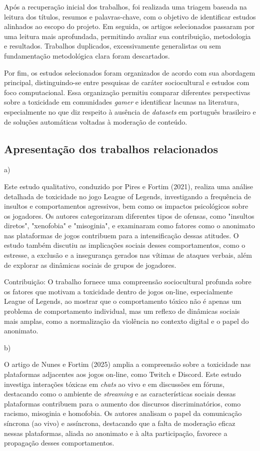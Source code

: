\documentclass{eic-bcc-tcc}
\begin{document}
Após a recuperação inicial dos trabalhos, foi realizada uma triagem baseada na leitura dos títulos, resumos e palavras-chave, com o objetivo de identificar estudos alinhados ao escopo do projeto. Em seguida, os artigos selecionados passaram por uma leitura mais aprofundada, permitindo avaliar sua contribuição, metodologia e resultados. Trabalhos duplicados, excessivamente generalistas ou sem fundamentação metodológica clara foram descartados.

Por fim, os estudos selecionados foram organizados de acordo com sua abordagem principal, distinguindo-se entre pesquisas de caráter sociocultural e estudos com foco computacional. Essa organização permitiu comparar diferentes perspectivas sobre a toxicidade em comunidades \textit{gamer} e identificar lacunas na literatura, especialmente no que diz respeito à ausência de \textit{datasets} em português brasileiro e de soluções automáticas voltadas à moderação de conteúdo.

\subsection{Apresentação dos trabalhos relacionados}

a) \cite{assali2024comportamento}

Este estudo qualitativo, conduzido por Pires e Fortim (2021), realiza uma análise detalhada de toxicidade no jogo League of Legends, investigando a frequência de insultos e comportamentos agressivos, bem como os impactos psicológicos sobre os jogadores. Os autores categorizaram diferentes tipos de ofensas, como "insultos diretos", "xenofobia" e "misoginia", e examinaram como fatores como o anonimato nas plataformas de jogos contribuem para a intensificação dessas atitudes. O estudo também discutiu as implicações sociais desses comportamentos, como o estresse, a exclusão e a insegurança gerados nas vítimas de ataques verbais, além de explorar as dinâmicas sociais de grupos de jogadores.

Contribuição: O trabalho fornece uma compreensão sociocultural profunda sobre os fatores que motivam a toxicidade dentro de jogos on-line, especialmente League of Legends, ao mostrar que o comportamento tóxico não é apenas um problema de comportamento individual, mas um reflexo de dinâmicas sociais mais amplas, como a normalização da violência no contexto digital e o papel do anonimato.

b) \cite{sbgames}

O artigo de Nunes e Fortim (2025) amplia a compreensão sobre a toxicidade nas plataformas adjacentes aos jogos on-line, como Twitch e Discord. Este estudo investiga interações tóxicas em \textit{chats} ao vivo e em discussões em fóruns, destacando como o ambiente de \textit{streaming} e as características sociais dessas plataformas contribuem para o aumento dos discursos discriminatórios, como racismo, misoginia e homofobia. Os autores analisam o papel da comunicação síncrona (ao vivo) e assíncrona, destacando que a falta de moderação eficaz nessas plataformas, aliada ao anonimato e à alta participação, favorece a propagação desses comportamentos.
\end{document}
